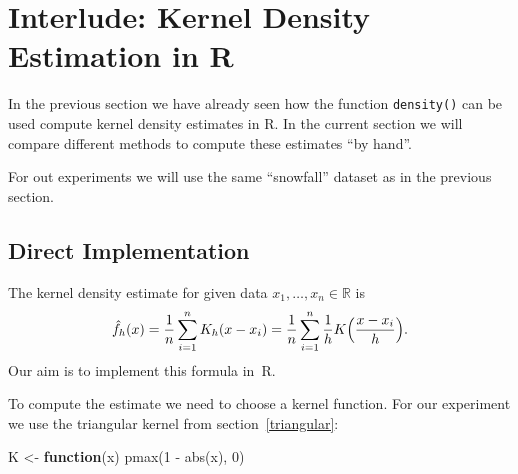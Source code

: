 \documentclass[
  a4paper,
]{article}
\newenvironment{Shaded}{\begin{snugshade}}{\end{snugshade}}
\newcommand{\CommentTok}[1]{\textcolor[rgb]{0.56,0.35,0.01}{\textit{#1}}}
\newcommand{\ControlFlowTok}[1]{\textcolor[rgb]{0.13,0.29,0.53}{\textbf{#1}}}
\newcommand{\DecValTok}[1]{\textcolor[rgb]{0.00,0.00,0.81}{#1}}
\newcommand{\FunctionTok}[1]{\textcolor[rgb]{0.00,0.00,0.00}{#1}}
\newcommand{\NormalTok}[1]{#1}
\newcommand{\OtherTok}[1]{\textcolor[rgb]{0.56,0.35,0.01}{#1}}
\newcommand{\SpecialCharTok}[1]{\textcolor[rgb]{0.00,0.00,0.00}{#1}}
\newcommand{\StringTok}[1]{\textcolor[rgb]{0.31,0.60,0.02}{#1}}
\theoremstyle{definition}
\theoremstyle{definition}
\theoremstyle{definition}
\theoremstyle{definition}
\theoremstyle{remark}
\begin{document}
\clearpage

\hypertarget{I01-KDE}{%
\section*{Interlude: Kernel Density Estimation in R}\label{I01-KDE}}

In the previous section we have already seen how the function \texttt{density()}
can be used compute kernel density estimates in R. In the current section
we will compare different methods to compute these estimates ``by hand''.

For out experiments we will use the same ``snowfall'' dataset as in the
previous section.

\begin{Shaded}
\end{Shaded}

\hypertarget{direct-implementation}{%
\subsection*{Direct Implementation}\label{direct-implementation}}

The kernel density estimate for given data \(x_1, \ldots, x_n \in\mathbb{R}\)
is
\begin{equation*}
  \hat f_h(x)
  = \frac{1}{n} \sum_{i=1}^n K_h(x - x_i)
  = \frac{1}{n} \sum_{i=1}^n \frac{1}{h} K\Bigl( \frac{x - x_i}{h} \Bigr).
\end{equation*}
Our aim is to implement this formula in~R.

To compute the estimate we need to choose a kernel function.
For our experiment we use the triangular kernel from section~\ref{triangular}:

\begin{Shaded}
\begin{Highlighting}[]
\NormalTok{K }\OtherTok{\textless{}{-}} \ControlFlowTok{function}\NormalTok{(x) }\FunctionTok{pmax}\NormalTok{(}\DecValTok{1} \SpecialCharTok{{-}} \FunctionTok{abs}\NormalTok{(x), }\DecValTok{0}\NormalTok{)}
\end{Highlighting}
\end{Shaded}
\end{document}
